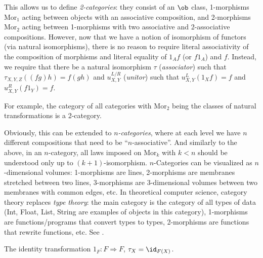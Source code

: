 \begin{rem}
This allows us to define \emph{2-categories}: they consist of an
$\ob$ class, 1-morphisms $\mathrm{Mor}_{1}$ acting between objects
with an associative composition, and 2-morphisms $\mathrm{Mor}_{2}$
acting between 1-morphisms with two associative and 2-associative
compositions. However, now that we have a notion of isomorphism of
functors (via natural isomorphisms), there is no reason to require
literal associativity of the composition of morphisms and literal
equality of $1_{A}f$ (or $f1_{A}$) and $f$. Instead, we require
that there be a natural isomorphism $\tau$ (\emph{associator})
such that $\tau_{X,Y,Z}\left(\left(fg\right)h\right)=f\left(gh\right)$
and $u_{X,Y}^{L/R}$ (\emph{unitor}) such that $u_{X,Y}^{L}\left(1_{X}f\right)=f$
and $u_{X,Y}^{R}\left(f1_{Y}\right)=f$.

For example, the category of all categories with $\mathrm{Mor}_{2}$
being the classes of natural transformations is a 2-category.

Obviously, this can be extended to \emph{$n$-categories}, where
at each level we have $n$ different compositions that need to be
``$n$-associative''. And similarly to the above, in an $n$-category,
all laws imposed on $\mathrm{Mor}_{k}$ with $k<n$ should be understood
only up to $\left(k+1\right)$-isomorphism. $n$-Categories can be
visualized as $n$-dimensional volumes: 1-morphisms are lines, 2-morphisms
are membranes stretched between two lines, 3-morphisms are 3-dimensional
volumes between two membranes with common edges, etc. In theoretical
computer science, category theory replaces \emph{type theory}: the
main category is the category of all types of data (Int, Float, List,
String are examples of objects in this category), 1-morphisms are
functions/programs that convert types to types, 2-morphisms are functions
that rewrite functions, etc. See \cite{CTCS}.
\end{rem}
\begin{example}
The identity transformation $1_{F}:F\Longrightarrow F$, $\tau_{X}=\id_{F(X)}$.
\end{example}
%
